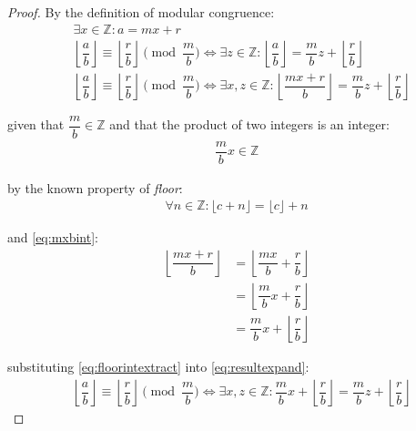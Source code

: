 \documentclass{article}
\begin{document}
\begin{proof}
By the definition of modular congruence:
\begin{align}
  &\exists {x} \in \mathbb{Z} : {a} = {m}{x} + {r} \label{eq:aexpand} \\
  &\left\lfloor\dfrac{{a}}{{b}}\right\rfloor \equiv \left\lfloor\dfrac{{r}}{{b}}\right\rfloor \pmod{\dfrac{{m}}{{b}}} \Leftrightarrow \exists {z} \in \mathbb{Z} : \left\lfloor\dfrac{{a}}{{b}}\right\rfloor = \dfrac{{m}}{{b}}{z} + \left\lfloor\dfrac{{r}}{{b}}\right\rfloor \\
  &\left\lfloor\dfrac{{a}}{{b}}\right\rfloor \equiv \left\lfloor\dfrac{{r}}{{b}}\right\rfloor \pmod{\dfrac{{m}}{{b}}} \Leftrightarrow \exists {x}, {z} \in \mathbb{Z} : \left\lfloor\dfrac{{m}{x} + {r}}{{b}}\right\rfloor = \dfrac{{m}}{{b}}{z} + \left\lfloor\dfrac{{r}}{{b}}\right\rfloor \label{eq:resultexpand}
\end{align}

given that $\dfrac{{m}}{{b}} \in \mathbb{Z}$ and that the product of two integers is an integer:
\begin{align}
  \dfrac{{m}}{{b}}{x} \in \mathbb{Z} \label{eq:mxbint}
\end{align}

by the known property of \textit{floor}:
\begin{align}
  \forall {n} \in \mathbb{Z} : \lfloor{c} + {n}\rfloor = \lfloor{c}\rfloor + {n}
\end{align}

and \eqref{eq:mxbint}:
\begin{align}
  \left\lfloor\dfrac{{m}{x} + {r}}{{b}}\right\rfloor
    &= \left\lfloor\dfrac{{m}{x}}{{b}} + \dfrac{{r}}{{b}}\right\rfloor \\
    &= \left\lfloor\dfrac{{m}}{{b}}{x} + \dfrac{{r}}{{b}}\right\rfloor \\
    &= \dfrac{{m}}{{b}}{x} + \left\lfloor\dfrac{{r}}{{b}}\right\rfloor \label{eq:floorintextract}
\end{align}

substituting \eqref{eq:floorintextract} into \eqref{eq:resultexpand}:
\begin{align}
  &\left\lfloor\dfrac{{a}}{{b}}\right\rfloor \equiv \left\lfloor\dfrac{{r}}{{b}}\right\rfloor \pmod{\dfrac{{m}}{{b}}} \Leftrightarrow \exists {x}, {z} \in \mathbb{Z} : \dfrac{{m}}{{b}}{x} + \left\lfloor\dfrac{{r}}{{b}}\right\rfloor = \dfrac{{m}}{{b}}{z} + \left\lfloor\dfrac{{r}}{{b}}\right\rfloor
\end{align}


\end{proof}
\end{document}
